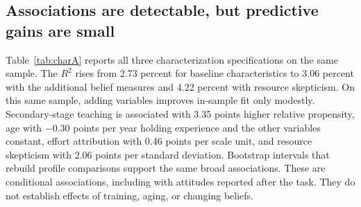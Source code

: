 \subsection{Associations are detectable, but predictive gains are small}
Table~\ref{tab:charA} reports all three characterization specifications on the same sample. The $R^2$ rises from 2.73 percent for baseline characteristics to 3.06 percent with the additional belief measures and 4.22 percent with resource skepticism. On this same sample, adding variables improves in-sample fit only modestly.
Secondary-stage teaching is associated with 3.35 points higher relative propensity, age with $-0.30$ points per year holding experience and the other variables constant, effort attribution with 0.46 points per scale unit, and resource skepticism with 2.06 points per standard deviation. Bootstrap intervals that rebuild profile comparisons support the same broad associations. These are conditional associations, including with attitudes reported after the task. They do not establish effects of training, aging, or changing beliefs.

